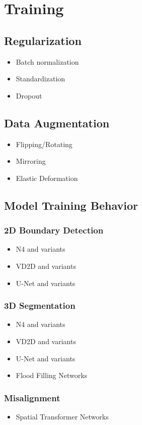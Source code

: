 \section{Training}

\subsection{Regularization}

\begin{itemize}
	\item Batch normalization
	\item Standardization
	\item Dropout
\end{itemize}

\subsection{Data Augmentation}

\begin{itemize}
	\item Flipping/Rotating
	\item Mirroring
	\item Elastic Deformation
\end{itemize}

\subsection{Model Training Behavior}

\subsubsection{2D Boundary Detection}

\begin{itemize}
	\item N4 and variants
	\item VD2D and variants
	\item U-Net and variants
\end{itemize}

\subsubsection{3D Segmentation}

\begin{itemize}
	\item N4 and variants
	\item VD2D and variants
	\item U-Net and variants
	\item Flood Filling Networks
\end{itemize}

\subsubsection{Misalignment}

\begin{itemize}
	\item Spatial Transformer Networks
\end{itemize}